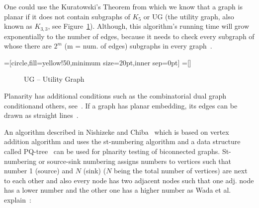One could use the Kuratowski's Theorem from which we know that a graph is planar if it does not contain subgraphs
of $ K_5 $ or UG (the utility graph, also known as $ K_{3,3} $, see Figure~\ref{fig:uggraph}). Although, this algorithm's running time will
grow exponentially to the number of edges, because it needs to check every subgraph of whose there are $ 2^m $ 
(m = num. of edges) subgraphs in every graph~\autocite[23]{nishizeki2008planar}.

=[circle,fill=yellow!50,minimum size=20pt,inner sep=0pt]
=[]

\begin{figure}[h]
\caption{UG -- Utility Graph}
\label{fig:uggraph}
\end{figure}

Planarity has additional conditions such as the combinatorial dual graph conditionand others, 
see~\autocite{weisstein2009planar,weisstein1999dual}. If a graph has planar embedding, its edges can be drawn 
as straight lines~\autocite{fary1948,deo1974graphs,weisstein2009planar}.

An algorithm described in Nishizeke and Chiba~\autocite{nishizeki2008planar} which is based on vertex addition 
algorithm and uses the st-numbering algorithm and a data structure 
called PQ-tree~\autocite[33]{nishizeki2008planar} can be used for plnarity testing of biconnected graphs. 
St-numbering or source-sink numbering assigns numbers to vertices such that number 1 (source) and $ N $ (sink) 
($ N $ being the total number of vertices) are next to each other and also every node has two adjacent nodes 
such that one adj. node has a lower number and the other one has a higher number 
as Wada et al. explain~\autocite[357]{wada1997Biconnected}:

